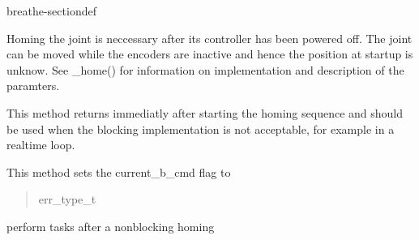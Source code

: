 \documentclass[letterpaper,10pt,english]{sphinxmanual}
\begin{document}
\begin{fulllineitems}
\begin{sphinxuseclass}{breathe-sectiondef}
\begin{fulllineitems}
\sphinxAtStartPar
Homing the joint is neccessary after its controller has been powered off. The joint can be moved while the encoders are inactive and hence the position at startup is unknow. See \_home() for information on implementation and description of the paramters.

\sphinxAtStartPar
This method returns immediatly after starting the homing sequence and should be used when the blocking implementation is not acceptable, for example in a realtime loop.

\sphinxAtStartPar
This method sets the current\_b\_cmd flag to {\hyperref[\detokenize{code/bioscara_hardware_drivers/index:classbioscara__hardware__drivers_1_1BaseJoint_1affbc9ba6c17b02af32647dc76796de13a93a9a074f04be4b2316dbbca5882b6fa}]{}} 
\begin{quote}\begin{description}
\sphinxAtStartPar
err\_type\_t 

\end{description}\end{quote}

\end{fulllineitems}


\begin{fulllineitems}
\label{\detokenize{code/bioscara_hardware_drivers/index:_CPPv4N25bioscara_hardware_drivers25bioscara_hardware_drivers9BaseJoint10postHomingEv}}\label{\detokenize{code/bioscara_hardware_drivers/index:_CPPv3N25bioscara_hardware_drivers25bioscara_hardware_drivers9BaseJoint10postHomingEv}}\label{\detokenize{code/bioscara_hardware_drivers/index:_CPPv2N25bioscara_hardware_drivers25bioscara_hardware_drivers9BaseJoint10postHomingEv}}\label{\detokenize{code/bioscara_hardware_drivers/index:bioscara_hardware_drivers::bioscara_hardware_drivers::BaseJoint::postHoming__void}}
\pysigstartsignatures
\pysigstartmultiline
\pysiglinewithargsret
{\label{\detokenize{code/bioscara_hardware_drivers/index:classbioscara__hardware__drivers_1_1BaseJoint_1acdbdac96efcea81f34db96a47b317a55}}}
{}
{}
\pysigstopmultiline
\pysigstopsignatures
\sphinxAtStartPar
perform tasks after a non\sphinxhyphen{}blocking homing 


\end{fulllineitems}
\end{sphinxuseclass}
\end{fulllineitems}
\end{document}
